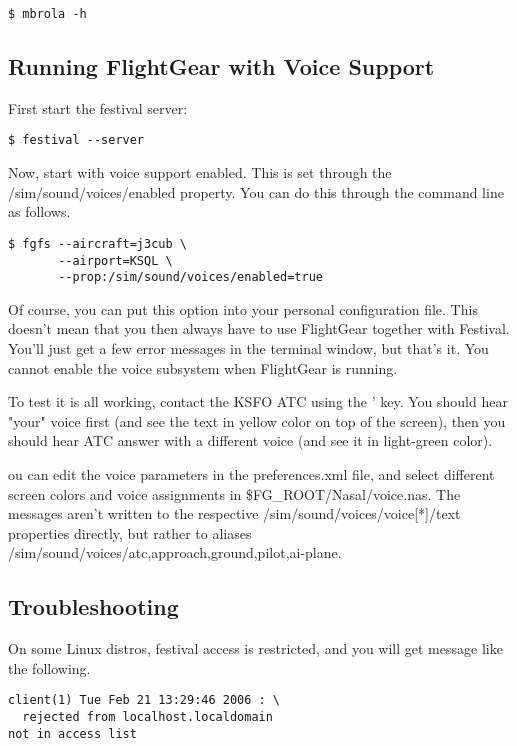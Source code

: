 \begin{enumerate}
\begin{enumerate}
\begin{verbatim}
$ mbrola -h
\end{verbatim}
\end{enumerate}

\subsection{Running FlightGear with Voice Support}

First start the festival server:

\begin{verbatim}
$ festival --server
\end{verbatim}

Now, start \FlightGear{} with voice support enabled. This is set through the
/sim/sound/voices/enabled property. You can do this through the command line as follows.

\begin{verbatim}
$ fgfs --aircraft=j3cub \
       --airport=KSQL \
       --prop:/sim/sound/voices/enabled=true
\end{verbatim}

Of course, you can put this option into your personal configuration file.
This doesn't mean that you then always have to use FlightGear together with Festival.
You'll just get a few error messages in the terminal window, but that's it. You cannot enable
the voice subsystem when FlightGear is running.

To test it is all working, contact the KSFO ATC using the ' key. You should hear "your"
voice first (and see the text in yellow color on top of the screen), then you should hear
ATC answer with a different voice (and see it in light-green color).

ou can edit the voice parameters in the preferences.xml file, and select different screen colors
and voice assignments in \$FG\_ROOT/Nasal/voice.nas. The messages aren't written to the
respective /sim/sound/voices/voice[*]/text properties directly, but rather to aliases
/sim/sound/voices/{atc,approach,ground,pilot,ai-plane}.

\subsection{Troubleshooting}

On some Linux distros, festival access is restricted, and you will get message like the following.

\begin{verbatim}
client(1) Tue Feb 21 13:29:46 2006 : \
  rejected from localhost.localdomain
not in access list
\end{verbatim}


\end{enumerate}
